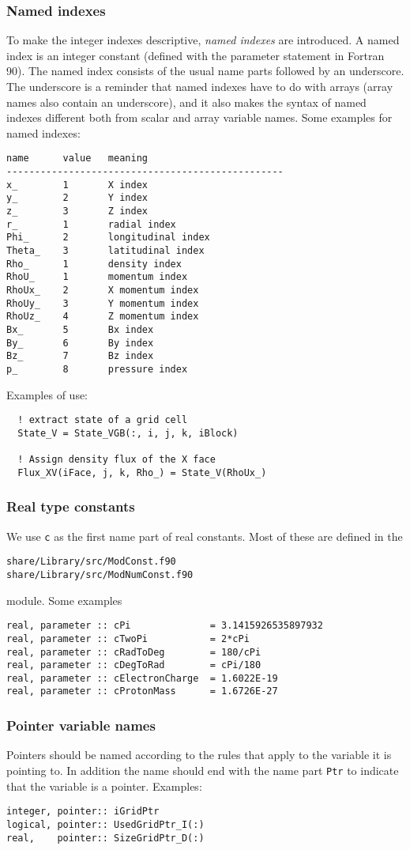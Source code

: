 \documentclass{article}
\begin{document}
\subsubsection{Named indexes \label{sec:named}}

To make the integer indexes descriptive, 
{\it named indexes} are introduced. A named index is
an integer constant (defined with the parameter statement in Fortran 90).
The named index consists of the usual name parts followed by
an underscore. The underscore is a reminder that named indexes
have to do with arrays (array names also contain an underscore), 
and it also makes the syntax of named
indexes different both from scalar and array variable names. 
Some examples for named indexes:
\begin{verbatim}
name      value   meaning
-------------------------------------------------
x_        1       X index
y_        2       Y index
z_        3       Z index
r_        1       radial index
Phi_      2       longitudinal index
Theta_    3       latitudinal index
Rho_      1       density index
RhoU_     1       momentum index
RhoUx_    2       X momentum index
RhoUy_    3       Y momentum index
RhoUz_    4       Z momentum index
Bx_       5       Bx index
By_       6       By index
Bz_       7       Bz index
p_        8       pressure index
\end{verbatim}
Examples of use:
\begin{verbatim}
  ! extract state of a grid cell
  State_V = State_VGB(:, i, j, k, iBlock)

  ! Assign density flux of the X face
  Flux_XV(iFace, j, k, Rho_) = State_V(RhoUx_)
\end{verbatim}

\subsubsection{Real type constants}

We use {\tt c} as the first name part of real constants. Most
of these are defined in the
\begin{verbatim}
share/Library/src/ModConst.f90
share/Library/src/ModNumConst.f90
\end{verbatim}
module. Some examples
\begin{verbatim}
real, parameter :: cPi              = 3.1415926535897932
real, parameter :: cTwoPi           = 2*cPi
real, parameter :: cRadToDeg        = 180/cPi
real, parameter :: cDegToRad        = cPi/180
real, parameter :: cElectronCharge  = 1.6022E-19
real, parameter :: cProtonMass      = 1.6726E-27
\end{verbatim}

\subsubsection{Pointer variable names}

Pointers should be named according to the rules that apply to the variable
it is pointing to. In addition the name should end with the name part 
{\tt Ptr} to indicate that the variable is a pointer. Examples:
\begin{verbatim}
integer, pointer:: iGridPtr
logical, pointer:: UsedGridPtr_I(:)
real,    pointer:: SizeGridPtr_D(:)
\end{verbatim}
\end{document}
